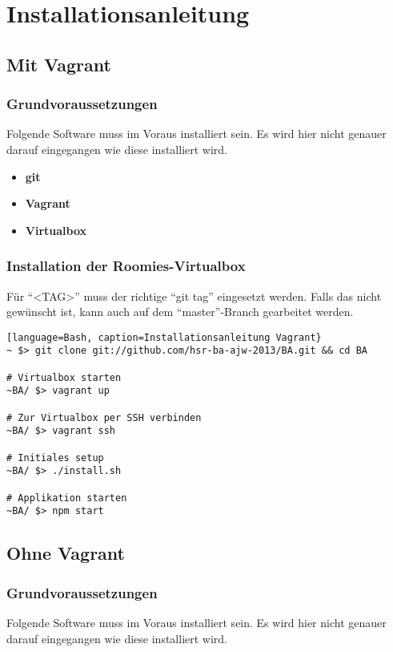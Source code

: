 \chapter{Installationsanleitung}

\section{Mit Vagrant}

\subsection*{Grundvoraussetzungen}
Folgende Software muss im Voraus installiert sein. Es wird hier nicht genauer
darauf eingegangen wie diese installiert wird.

\begin{itemize}
	\item \textbf{git} \cite{git}
	\item \textbf{Vagrant} \cite{Vagrant}
	\item \textbf{Virtualbox} \cite{Virtualbox}
\end{itemize}

\subsection*{Installation der Roomies-Virtualbox}
Für ``<TAG>'' muss der richtige ``git tag'' eingesetzt werden. Falls das nicht gewünscht ist, kann auch auf dem ``master''-Branch gearbeitet werden.

\begin{lstlisting}[language=Bash, caption=Installationsanleitung Vagrant}
~ $> git clone git://github.com/hsr-ba-ajw-2013/BA.git && cd BA

# Virtualbox starten
~BA/ $> vagrant up

# Zur Virtualbox per SSH verbinden
~BA/ $> vagrant ssh

# Initiales setup
~BA/ $> ./install.sh

# Applikation starten
~BA/ $> npm start
\end{lstlisting}

\section{Ohne Vagrant}

\subsection*{Grundvoraussetzungen}
Folgende Software muss im Voraus installiert sein. Es wird hier nicht genauer
darauf eingegangen wie diese installiert wird.

